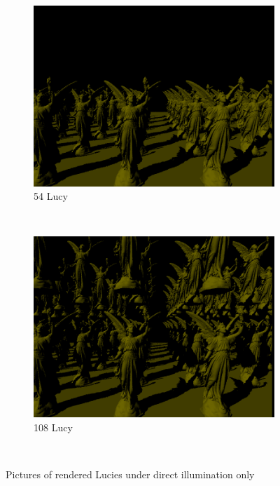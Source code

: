 \documentclass[a4paper, oneside, 10pt]{article}
\begin{document}
\begin{figure}[h]
\begin{subfigure}[b]{0.3\textwidth}
                \label{fig:d36lucy}
        \end{subfigure}%
        ~ %
        \begin{subfigure}[b]{0.3\textwidth}
                \includegraphics[width=\textwidth]{d54lucy}
                \caption{54 Lucy}
                \label{fig:d54lucy}
        \end{subfigure}
        ~ %
        \begin{subfigure}[b]{0.3\textwidth}
                \includegraphics[width=\textwidth]{d108lucy_1}
                \caption{108 Lucy}
                \label{fig:d108lucy}
        \end{subfigure}
        \caption{Pictures of rendered Lucies under direct illumination only}\
\end{figure}
\end{document}
